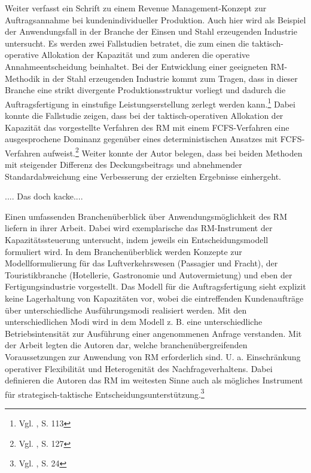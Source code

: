 Weiter verfasst \cite{rehkopf2007revenue} ein Schrift zu einem Revenue Management-Konzept zur Auftragsannahme bei kundenindividueller Produktion. Auch hier wird als Beispiel der Anwendungsfall in der Branche der Einsen und Stahl erzeugenden Industrie untersucht. Es werden zwei Fallstudien betratet, die zum einen die taktisch-operative Allokation der Kapazität und zum anderen die operative Annahmeentscheidung beinhaltet. Bei der Entwicklung einer geeigneten RM-Methodik in der Stahl erzeugenden Industrie kommt zum Tragen, dass in dieser Branche eine strikt divergente Produktionsstruktur vorliegt und dadurch die Auftragsfertigung in einstufige Leistungserstellung zerlegt werden kann.\footnote{Vgl. \cite{rehkopf2007revenue}, S. 113} Dabei konnte die Fallstudie zeigen, dass bei der taktisch-operativen Allokation der Kapazität das vorgestellte Verfahren des RM mit einem FCFS-Verfahren eine ausgesprochene Dominanz gegenüber eines deterministischen Ansatzes mit FCFS-Verfahren aufweist.\footnote{Vgl. \cite{rehkopf2007revenue}, S. 127} Weiter konnte der Autor belegen, dass bei beiden Methoden mit steigender Differenz des Deckungsbeitrags und abnehmender Standardabweichung eine Verbesserung der erzielten Ergebnisse einhergeht. 

.... Das doch kacke....

Einen umfassenden Branchenüberblick über Anwendungsmöglichkeit des RM liefern \cite{kimms2005branchenverg} in ihrer Arbeit. Dabei wird exemplarische das RM-Instrument der Kapazitätssteuerung untersucht, indem jeweils ein Entscheidungsmodell formuliert wird. In dem Branchenüberblick werden Konzepte zur Modellformulierung für das Luftverkehrswesen (Passagier und Fracht), der Touristikbranche (Hotellerie, Gastronomie und Autovermietung) und eben der Fertigungsindustrie vorgestellt. Das Modell für die Auftragsfertigung sieht explizit keine Lagerhaltung von Kapazitäten vor, wobei die eintreffenden Kundenaufträge über unterschiedliche Ausführungsmodi realisiert werden. Mit den unterschiedlichen Modi wird in dem Modell z. B. eine unterschiedliche Betriebsintensität zur Ausführung einer angenommenen Anfrage verstanden. Mit der Arbeit legten die Autoren dar, welche branchenübergreifenden Voraussetzungen zur Anwendung von RM erforderlich sind. U. a. Einschränkung operativer Flexibilität und Heterogenität des Nachfrageverhaltens. Dabei definieren die Autoren das RM im weitesten Sinne auch als mögliches Instrument für strategisch-taktische Entscheidungsunterstützung.\footnote{Vgl. \cite{kimms2005branchenverg}, S. 24} 

